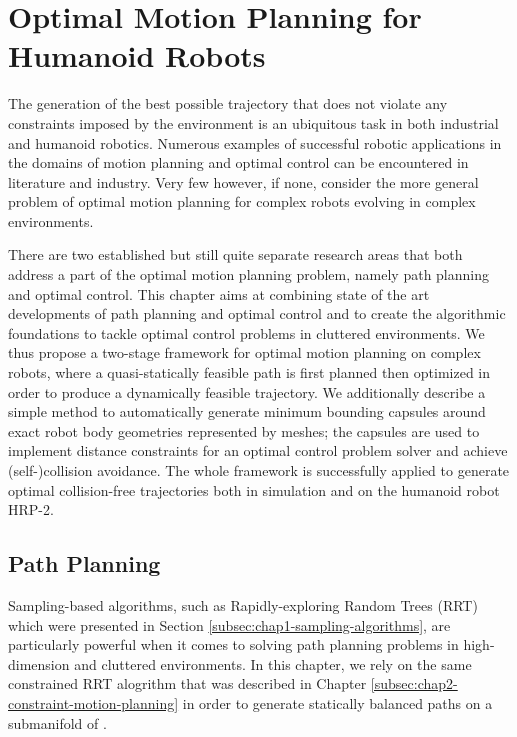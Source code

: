 \chapter{Optimal Motion Planning for Humanoid Robots}
\label{chap:optimal-motion-planning}

The generation of the best possible trajectory that does not violate
any constraints imposed by the environment is an ubiquitous task in
both industrial and humanoid robotics. Numerous examples of successful
robotic applications in the domains of motion planning and optimal
control can be encountered in literature and industry. Very few
however, if none, consider the more general problem of optimal motion
planning for complex robots evolving in complex environments.

There are two established but still quite separate research areas that
both address a part of the optimal motion planning problem, namely
path planning and optimal control. This chapter aims at combining
state of the art developments of path planning and optimal control and
to create the algorithmic foundations to tackle optimal control
problems in cluttered environments. We thus propose a two-stage
framework for optimal motion planning on complex robots, where a
quasi-statically feasible path is first planned then optimized in
order to produce a dynamically feasible trajectory. We additionally
describe a simple method to automatically generate minimum bounding
capsules around exact robot body geometries represented by meshes; the
capsules are used to implement distance constraints for an optimal
control problem solver and achieve (self-)collision avoidance. The
whole framework is successfully applied to generate optimal
collision-free trajectories both in simulation and on the humanoid
robot HRP-2.

\section{Path Planning}

Sampling-based algorithms, such as Rapidly-exploring Random Trees
(RRT) which were presented in Section
\ref{subsec:chap1-sampling-algorithms}, are particularly powerful when
it comes to solving path planning problems in
high-dimension \cspace\thinspace and cluttered environments. In this
chapter, we rely on the same constrained RRT alogrithm that was
described in Chapter \ref{subsec:chap2-constraint-motion-planning} in
order to generate statically balanced paths on a submanifold
of \cspace.

